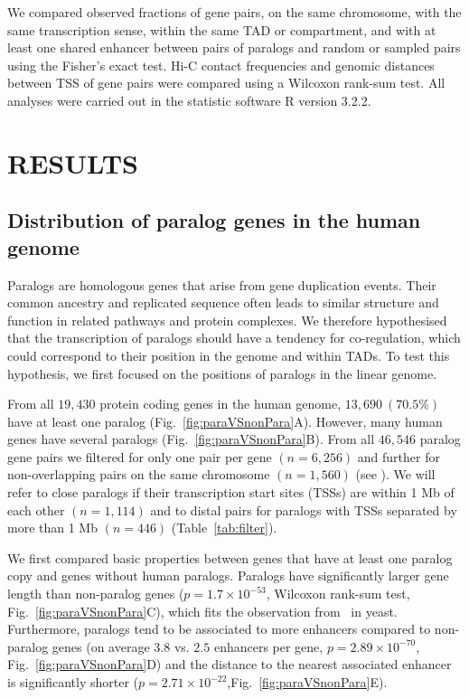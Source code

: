 \documentclass[a4paper,twoside=true,openright,parskip=full,chapterprefix=true,11pt,headings=normal,bibliography=totoc,listof=totoc,titlepage=on,captions=tableabove,draft=false]{scrreprt}
\theoremstyle{definition}
\theoremstyle{definition}
\theoremstyle{definition}
\theoremstyle{remark}
\begin{document}
We compared observed fractions of gene pairs, on the same chromosome,
with the same transcription sense, within the same TAD or compartment,
and with at least one shared enhancer between pairs of paralogs and
random or sampled pairs using the Fisher's exact test. Hi-C contact
frequencies and genomic distances between TSS of gene pairs were
compared using a Wilcoxon rank-sum test. All analyses were carried out
in the statistic software R version 3.2.2.

\section{RESULTS}\label{results}

\subsection{Distribution of paralog genes in the human
genome}\label{distribution-of-paralog-genes-in-the-human-genome}

Paralogs are homologous genes that arise from gene duplication events.
Their common ancestry and replicated sequence often leads to similar
structure and function in related pathways and protein complexes. We
therefore hypothesised that the transcription of paralogs should have a
tendency for co-regulation, which could correspond to their position in
the genome and within TADs. To test this hypothesis, we first focused on
the positions of paralogs in the linear genome.

From all \(19,430\) protein coding genes in the human genome,
\(13,690~(70.5\%)\) have at least one paralog
(Fig.~\ref{fig:paraVSnonPara}A). However, many human genes have several
paralogs (Fig.~\ref{fig:paraVSnonPara}B). From all \(46,546\) paralog
gene pairs we filtered for only one pair per gene \((n=6,256)\) and
further for non-overlapping pairs on the same chromosome \((n=1,560)\)
(see ). We will refer to close paralogs if their transcription start
sites (TSSs) are within 1 Mb of each other \((n=1,114)\) and to distal
pairs for paralogs with TSSs separated by more than 1 Mb \((n=446)\)
(Table~\ref{tab:filter}).

We first compared basic properties between genes that have at least one
paralog copy and genes without human paralogs. Paralogs have
significantly larger gene length than non-paralog genes
(\(p = 1.7 \times 10^{-53}\), Wilcoxon rank-sum test,
Fig.~\ref{fig:paraVSnonPara}C), which fits the observation
from~\citep{He2005} in yeast. Furthermore, paralogs tend to be
associated to more enhancers compared to non-paralog genes (on average
\(3.8\) vs. \(2.5\) enhancers per gene, \(p=2.89\times10^{-70}\),
Fig.~\ref{fig:paraVSnonPara}D) and the distance to the nearest
associated enhancer is significantly shorter
(\(p=2.71\times10^{-22}\),Fig.~\ref{fig:paraVSnonPara}E).
\end{document}
